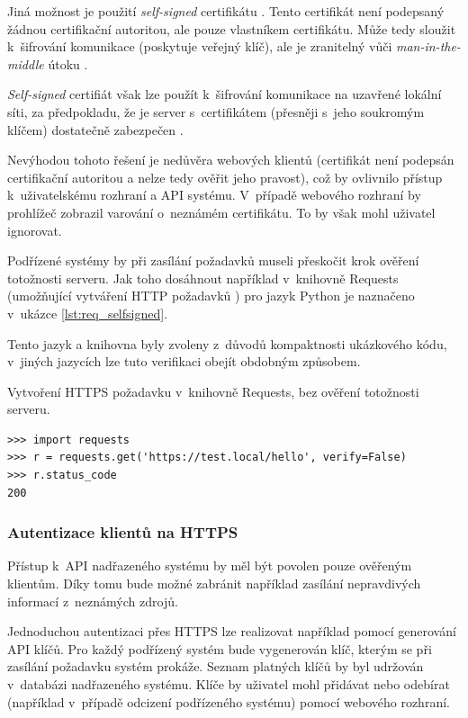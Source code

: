 Jiná možnost je použití \textit{self-signed} certifikátu \cite{cert_wallen}. Tento certifikát není podepsaný žádnou certifikační autoritou, ale pouze vlastníkem certifikátu. Může tedy sloužit k~šifrování komunikace (poskytuje veřejný klíč), ale je zranitelný vůči \textit{man-in-the-middle} útoku \cite{cert_wallen}.

\textit{Self-signed} certifiát však lze použít k~šifrování komunikace na uzavřené lokální síti, za předpokladu, že je server s~certifikátem (přesněji s~jeho soukromým klíčem) dostatečně zabezpečen \cite{cert_wallen}. 

Nevýhodou tohoto řešení je nedůvěra webových klientů (certifikát není podepsán certifikační autoritou a nelze tedy ověřit jeho pravost), což by ovlivnilo přístup k~uživatelskému rozhraní a API systému. V~případě webového rozhraní by prohlížeč zobrazil varování o~neznámém certifikátu. To by však mohl uživatel ignorovat. 

Podřízené systémy by při zasílání požadavků museli přeskočit krok ověření totožnosti serveru. Jak toho dosáhnout například v~knihovně Requests (umožňující vytváření HTTP požadavků \cite{requests}) pro jazyk Python \cite{python_tutorial} je naznačeno v~ukázce \ref{lst:req_selfsigned}. 

Tento jazyk a knihovna byly zvoleny z~důvodů kompaktnosti ukázkového kódu, v~jiných jazycích lze tuto verifikaci obejít obdobným způsobem.

\begin{listing}[htbp]
\caption{\label{lst:req_selfsigned} Vytvoření HTTPS požadavku v~knihovně Requests, bez ověření totožnosti serveru.}
\begin{verbatim}
>>> import requests
>>> r = requests.get('https://test.local/hello', verify=False)
>>> r.status_code
200
\end{verbatim}
\end{listing}

\subsubsection{Autentizace klientů na HTTPS}

Přístup k~API nadřazeného systému by měl být povolen pouze ověřeným klientům. Díky tomu bude možné zabránit například zasílání nepravdivých informací z~neznámých zdrojů.

Jednoduchou autentizaci přes HTTPS lze realizovat například pomocí generování API klíčů. Pro každý podřízený systém bude vygenerován klíč, kterým se při zasílání požadavku systém prokáže. Seznam platných klíčů by byl udržován v~databázi nadřazeného systému. Klíče by uživatel mohl přidávat nebo odebírat (například v~případě odcizení podřízeného systému) pomocí webového rozhraní.

